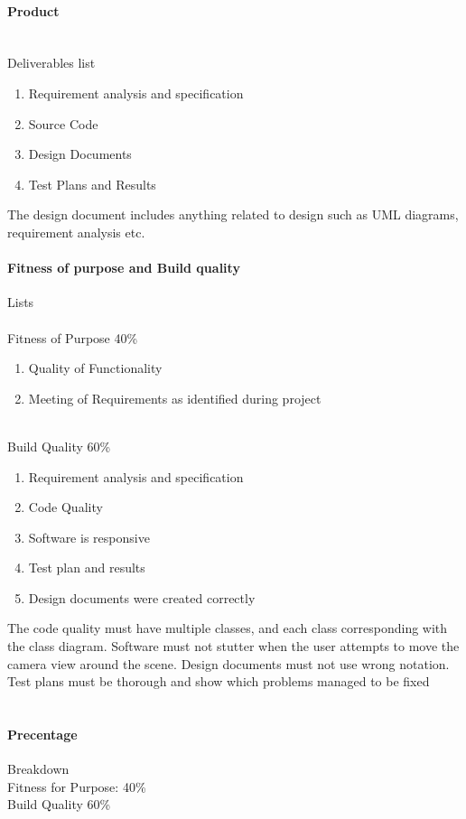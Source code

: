 \documentclass[]{article}
\begin{document}
\paragraph{Product}
\\
Deliverables list
\begin{enumerate}
	\item Requirement analysis and specification 
    \item Source Code 
    \item Design Documents
    \item Test Plans and Results
\end{enumerate}
The design document includes anything related to design such as UML diagrams, requirement analysis etc.

\paragraph{Fitness of purpose and Build quality} Lists
\\\\
Fitness of Purpose 40\%
\begin{enumerate}
  \item Quality of Functionality
  \item Meeting of Requirements as identified during project
\end{enumerate}
\\
Build Quality 60\%
\begin{enumerate}
  \item Requirement analysis and specification 
  \item Code Quality
  \item Software is responsive
  \item Test plan and results
  \item Design documents were created correctly
\end{enumerate}
The code quality must have multiple classes, and each class corresponding with the class diagram. 
Software must not stutter when the user attempts to move the camera view around the scene.
Design documents must not use wrong notation.
Test plans must be thorough and show which problems managed to be fixed
\\\\
\paragraph{Precentage} Breakdown\\
Fitness for Purpose: 40\% \\ Build Quality 60\%
\end{document}
